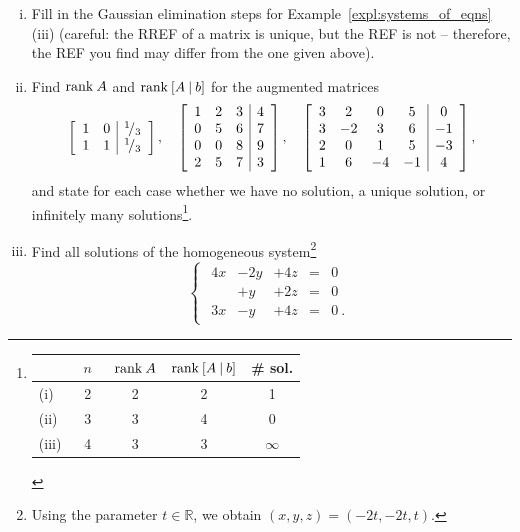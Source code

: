 \begin{exercise}
\begin{enumerate}[(i)]
	\item Fill in the Gaussian elimination steps for Example~\ref{expl:systems_of_eqns} (iii) (careful: the RREF of a matrix is unique, but the REF is not -- therefore, the REF you find may differ from the one given above).
	\item Find $\text{rank}\: A$ and $\text{rank}\: [A\:|\:b]$ for the augmented matrices
	\[ \left[ \begin{array}{cc|c}
	1 & 0 & {}^{1}\!/_{3} \\
	1 & 1 & {}^{1}\!/_{3} 
	\end{array} \right], \quad
	\left[ \begin{array}{ccc|c}
	1 & 2 & 3 & 4 \\
	0 & 5 & 6 & 7 \\
	0 & 0 & 8 & 9 \\
	2 & 5 & 7 & 3 
	\end{array} \right], \quad
	\left[ \begin{array}{cccc|c}
	3 & 2 & 0 & 5 & 0 \\
	3 & -2 & 3 & 6 & -1 \\
	2 & 0 & 1 & 5 & -3 \\
	1 & 6 & -4 & -1 & 4 
	\end{array} \right], \]
	and state for each case whether we have no solution, a unique solution, or infinitely many solutions\footnote{
\begin{center}
	\begin{tabular}{ l | c | c | c | c}
		 & ~$n$~ & $\text{rank}\: A$ & $\text{rank}\: [A\:|\:b]$ &  \# sol. \\ \hline
		(i) & 2 & 2 & 2 & 1 \\ \hline
		(ii) & 3 & 3 & 4 & 0 \\ \hline
		(iii) & 4 & 3 & 3 & $\infty$ \\
		\hline
	\end{tabular}
\end{center}}.
	\item Find all solutions of the homogeneous system\footnote{Using the parameter $t\in\mathbb{R}$, we obtain $(x,y,z)=(-2t,-2t,t)$.}
	\[ \begin{cases}	
		\begin{array}{rrrrrrr}
			4x & -2y & +4z & = & 0 \phantom{\:.}\\
			   &  +y & +2z & = & 0 \phantom{\:.}\\
			3x &  -y & +4z & = & 0 \:. 
		\end{array} \end{cases} \]

\end{enumerate}
\end{exercise}
